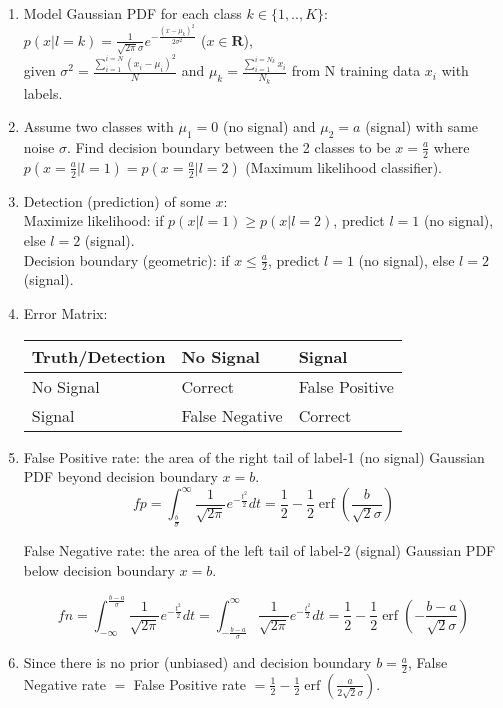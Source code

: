 \documentclass[11pt]{article}
\DeclareMathOperator{\erf}{erf}
\begin{document}
    \begin{enumerate}
    \item Model Gaussian PDF for each class $k \in \{1,..,K\}$:
    $p(x|l=k) = \frac{1}{\sqrt{2\pi}\sigma} e^{-\frac{{(x-\mu_k)}^2}{2\sigma^2}}$ ($x \in \mathbf{R}$),\\
    given $\sigma^2=\frac{\sum_{i=1}^{i=N} {(x_i-\mu_i)}^2}{N}$ and $\mu_k = \frac{\sum_{i=1}^{i=N_k} x_i}{N_k}$ from N training data $x_i$ with labels. 
    \item Assume two classes with $\mu_1 = 0$ (no signal) and $\mu_2 = a$ (signal) with same noise $\sigma$. Find decision boundary between the 2 classes to be $x=\frac{a}{2}$ where $p(x=\frac{a}{2}|l=1) = p(x=\frac{a}{2}|l=2)$ (Maximum likelihood classifier).
    \item Detection (prediction) of some $x$: \\
    Maximize likelihood: if $p(x|l=1) \ge p(x|l=2)$, predict $l=1$ (no signal), else $l=2$ (signal).\\
    Decision boundary (geometric): if $x \leq \frac{a}{2}$, predict $l=1$ (no signal), else $l=2$ (signal).
    \item Error Matrix:
    
    \begin{tabular}{l|l|l}
    Truth/Detection&No Signal&Signal\\\hline
    No Signal&Correct&False Positive\\\hline
    Signal&False Negative&Correct\\
    \end{tabular}
    \item False Positive rate: the area of the right tail of label-1 (no signal) Gaussian PDF beyond decision boundary $x=b$.
    \begin{equation}
        fp = \int_{\frac{b}{\sigma}}^{\infty} \frac{1}{\sqrt{2\pi}} e^{-\frac{t^2}{2}}dt = \frac{1}{2} - \frac{1}{2} \erf(\frac{b}{\sqrt{2}\sigma})
    \label{eq:1}
    \end{equation}
    
    False Negative rate: the area of the left tail of label-2 (signal) Gaussian PDF below decision boundary $x=b$.
    
    \begin{equation}
        fn = \int_{-\infty}^{\frac{b-a}{\sigma}} \frac{1}{\sqrt{2\pi}} e^{-\frac{t^2}{2}}dt = \int_{-\frac{b-a}{\sigma}}^{\infty} \frac{1}{\sqrt{2\pi}} e^{-\frac{t^2}{2}}dt = \frac{1}{2} - \frac{1}{2} \erf(-\frac{b-a}{\sqrt{2}\sigma})
    \label{eq:2}
    \end{equation}
    
    
    \item Since there is no prior (unbiased) and decision boundary $b=\frac{a}{2}$, False Negative rate $=$ False Positive rate $= \frac{1}{2} - \frac{1}{2} \erf(\frac{a}{2\sqrt{2}\sigma})$.
\end{enumerate}
\end{document}
